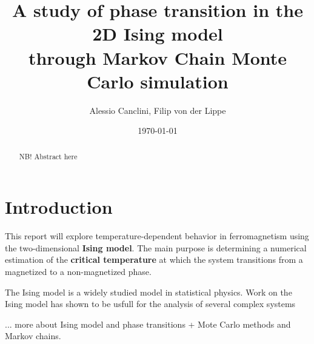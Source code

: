 \documentclass[english,notitlepage,reprint,nofootinbib]{revtex4-1}  %
\begin{document}
\title{A study of phase transition in the 2D Ising model\\through Markov Chain Monte Carlo simulation}  %
\author{Alessio Canclini, Filip von der Lippe} %
\date{\today}                             %
\noaffiliation                            %

\begin{abstract}
    NB! Abstract here
\end{abstract}
\maketitle


\section{Introduction}
This report will explore temperature-dependent behavior in ferromagnetism using the two-dimensional \textbf{Ising model}. The main purpose is determining a numerical estimation of the \textbf{critical temperature} at which the system transitions from a magnetized to a non-magnetized phase.

The Ising model is a widely studied model in statistical physics. Work on the Ising model has shown to be usfull for the analysis of several complex systems 

... more about Ising model and phase transitions
+ Mote Carlo methods and Markov chains. \cite{compendium}

\end{document}
